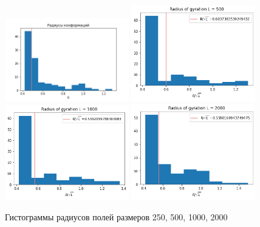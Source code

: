 \begin{figure}[h]
	\centering
	\includegraphics[width=0.48\textwidth]{../images/R_hist_L250.png} 
	\includegraphics[width=0.48\textwidth]{../images/R_hist_L500.png} 
	\includegraphics[width=0.48\textwidth]{../images/R_hist_L1000.png} 
	\includegraphics[width=0.48\textwidth]{../images/R_hist_L2000.png} 
	\caption{Гистограммы радиусов полей размеров 250, 500, 1000, 2000}
\end{figure}

